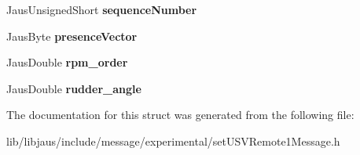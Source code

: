 \begin{DoxyCompactItemize}
\item 
\hypertarget{struct_set_u_s_v_remote1_message_struct_aeeff9df845a7086a95e428e4530294d6}{\-Jaus\-Unsigned\-Short {\bfseries sequence\-Number}}\label{struct_set_u_s_v_remote1_message_struct_aeeff9df845a7086a95e428e4530294d6}

\item 
\hypertarget{struct_set_u_s_v_remote1_message_struct_ac4d236d19a474fa0e941c3d7f233f319}{\-Jaus\-Byte {\bfseries presence\-Vector}}\label{struct_set_u_s_v_remote1_message_struct_ac4d236d19a474fa0e941c3d7f233f319}

\item 
\hypertarget{struct_set_u_s_v_remote1_message_struct_a196df1621426e4f38aff128336144b13}{\-Jaus\-Double {\bfseries rpm\-\_\-order}}\label{struct_set_u_s_v_remote1_message_struct_a196df1621426e4f38aff128336144b13}

\item 
\hypertarget{struct_set_u_s_v_remote1_message_struct_ac10da5a1ecd2bd9b1f639a3bbd5bc0de}{\-Jaus\-Double {\bfseries rudder\-\_\-angle}}\label{struct_set_u_s_v_remote1_message_struct_ac10da5a1ecd2bd9b1f639a3bbd5bc0de}

\end{DoxyCompactItemize}


\-The documentation for this struct was generated from the following file\-:\begin{DoxyCompactItemize}
\item 
lib/libjaus/include/message/experimental/set\-U\-S\-V\-Remote1\-Message.\-h\end{DoxyCompactItemize}
